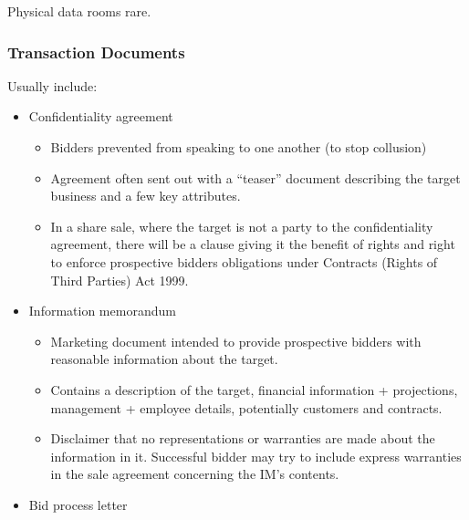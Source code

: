 \documentclass[
]{article}
\providecommand{\tightlist}{%
  \setlength{\itemsep}{0pt}\setlength{\parskip}{0pt}}
\begin{document}
Physical data rooms rare.

\hypertarget{transaction-documents}{%
\subsubsection{Transaction Documents}\label{transaction-documents}}

Usually include:

\begin{itemize}
\tightlist
\item
  Confidentiality agreement

  \begin{itemize}
  \tightlist
  \item
    Bidders prevented from speaking to one another (to stop collusion)
  \item
    Agreement often sent out with a ``teaser'' document describing the
    target business and a few key attributes.
  \item
    In a share sale, where the target is not a party to the
    confidentiality agreement, there will be a clause giving it the
    benefit of rights and right to enforce prospective bidders
    obligations under Contracts (Rights of Third Parties) Act 1999.
  \end{itemize}
\item
  Information memorandum

  \begin{itemize}
  \tightlist
  \item
    Marketing document intended to provide prospective bidders with
    reasonable information about the target.
  \item
    Contains a description of the target, financial information +
    projections, management + employee details, potentially customers
    and contracts.
  \item
    Disclaimer that no representations or warranties are made about the
    information in it. Successful bidder may try to include express
    warranties in the sale agreement concerning the IM's contents.
  \end{itemize}
\item
  Bid process letter


\end{itemize}
\end{document}
